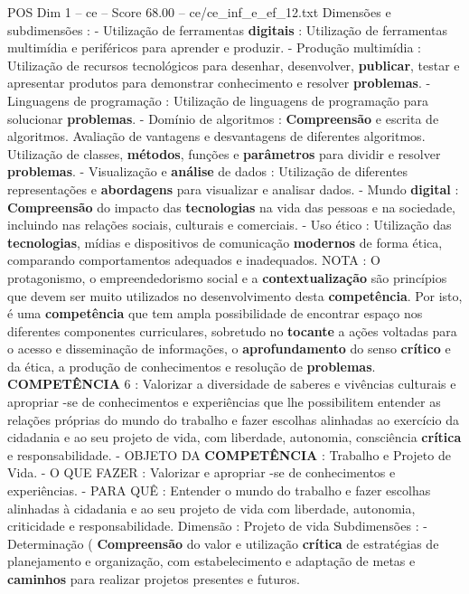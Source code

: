 \begin{textsample}{POS Dim 1 – ce – Score 68.00 – ce/ce\_inf\_e\_ef\_12.txt}
Dimensões e subdimensões : - Utilização de ferramentas \textbf{digitais} : Utilização de ferramentas multimídia e periféricos para aprender e produzir. - Produção multimídia : Utilização de recursos tecnológicos para desenhar, desenvolver, \textbf{publicar}, testar e apresentar produtos para demonstrar conhecimento e resolver \textbf{problemas}. - Linguagens de programação : Utilização de linguagens de programação para solucionar \textbf{problemas}. - Domínio de algoritmos : \textbf{Compreensão} e escrita de algoritmos.
Avaliação de vantagens e desvantagens de diferentes algoritmos.
Utilização de classes, \textbf{métodos}, funções e \textbf{parâmetros} para dividir e resolver \textbf{problemas}. - Visualização e \textbf{análise} de dados : Utilização de diferentes representações e \textbf{abordagens} para visualizar e analisar dados. - Mundo \textbf{digital} : \textbf{Compreensão} do impacto das \textbf{tecnologias} na vida das pessoas e na sociedade, incluindo nas relações sociais, culturais e comerciais. - Uso ético : Utilização das \textbf{tecnologias}, mídias e dispositivos de comunicação \textbf{modernos} de forma ética, comparando comportamentos adequados e inadequados.
NOTA : O protagonismo, o empreendedorismo social e a \textbf{contextualização} são princípios que devem ser muito utilizados no desenvolvimento desta \textbf{competência}.
Por isto, é uma \textbf{competência} que tem ampla possibilidade de encontrar espaço nos diferentes componentes curriculares, sobretudo no \textbf{tocante} a ações voltadas para o acesso e disseminação de informações, o \textbf{aprofundamento} do senso \textbf{crítico} e da ética, a produção de conhecimentos e resolução de \textbf{problemas}. \textbf{COMPETÊNCIA} 6 : Valorizar a diversidade de saberes e vivências culturais e apropriar -se de conhecimentos e experiências que lhe possibilitem entender as relações próprias do mundo do trabalho e fazer escolhas alinhadas ao exercício da cidadania e ao seu projeto de vida, com liberdade, autonomia, consciência \textbf{crítica} e responsabilidade. - OBJETO DA \textbf{COMPETÊNCIA} : Trabalho e Projeto de Vida. - O QUE FAZER : Valorizar e apropriar -se de conhecimentos e experiências. - PARA QUÊ : Entender o mundo do trabalho e fazer escolhas alinhadas à cidadania e ao seu projeto de vida com liberdade, autonomia, criticidade e responsabilidade.
Dimensão : Projeto de vida Subdimensões : - Determinação ( \textbf{Compreensão} do valor e utilização \textbf{crítica} de estratégias de planejamento e organização, com estabelecimento e adaptação de metas e \textbf{caminhos} para realizar projetos presentes e futuros.

\end{textsample}
